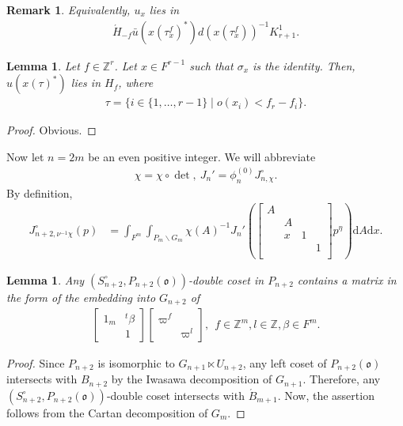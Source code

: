 \documentclass[11pt]{amsart}
\newcommand\s{\sigma}%
\newcommand\Vp{\varpi}%
\newcommand\vp{\varphi}%
\newcommand\oo{\mathfrak{o}}
\newcommand\dr{\mathrm{d}}
\newcommand\Z{{\mathbb{Z}}}
\newcommand\1{\mathbf{1}}
\newcommand\ac{\acute}
\newcommand\bs{\backslash}%
\newcommand\bu{\bar{u}}
\numberwithin{equation}{section}
\newtheorem{lem}[thm]{Lemma}
\newtheorem{rem}[thm]{Remark}
\begin{document}
\begin{rem}\label{rem:ux}
Equivalently, $u_x$ lies in 
\begin{align*}
\ac{H}_{-f} \bu(x(\tau_x^f)^*) d(x(\tau_x^f))^{-1} K^1_{r+1}.
\end{align*} 
\end{rem}
\begin{lem}
Let $f \in \Z^r$.
Let $x \in F^{r-1}$ such that $\s_x$ is the identity.
Then, $u(x(\tau)^*)$ lies in $H_f$, where 
\begin{align*}
\tau = \{i \in \{1, \ldots, r-1\} \mid o(x_{i}) < f_{r} - f_{i} \}.
\end{align*}  
\end{lem}
\begin{proof}
Obvious.
\end{proof}
Now let $n = 2m$ be an even positive integer.
We will abbreviate
\begin{align*}
\chi = \chi \circ \det, \ J_n' = \phi_n^{(0)} J_{n,\chi}^\circ.
\end{align*}
By definition, 
\begin{align*}
J_{n+2,\nu^{-1}\chi}^\circ(p) &= \int_{F^m} \int_{P_m \bs G_{m}} \chi(A)^{-1} J_{n}'(\begin{bmatrix}
A & & &  \\
&A & & \\
& x & 1 &  \\
& & &1  \\
\end{bmatrix}p^\eta) \dr A \dr x.
\end{align*} 
\begin{lem}\label{lem:RSSP}
Any $(S_{n+2}^\circ, P_{n+2}(\oo))$-double coset in $P_{n+2}$ contains a matrix in the form of the embedding into $G_{n+2}$ of   
\begin{align}
\begin{bmatrix}
1_{m} & {}^t \beta\\
& 1 
\end{bmatrix}
\begin{bmatrix}
\Vp^f &  \\
& \Vp^l 
\end{bmatrix}, \ \ f \in \Z^{m}, l \in \Z, \beta \in F^m. \label{def:g_n+2}
\end{align} 
\end{lem}
\begin{proof}
Since $P_{n+2}$ is isomorphic to $G_{n+1} \ltimes U_{n+2}$, any left coset of $P_{n+2}(\oo)$ intersects with $B_{n+2}$ by the Iwasawa decomposition of $G_{n+1}$.
Therefore, any $(S_{n+2}^\circ, P_{n+2}(\oo))$-double coset intersects with $\ac{B}_{m+1}$.
Now, the assertion follows from the Cartan decomposition of $G_{m}$.
\end{proof}
\end{document}
